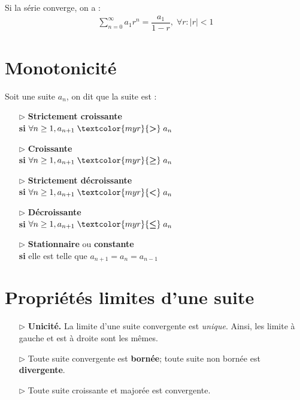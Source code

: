 \documentclass{report}
\begin{document}
\begin{multicols*}{3}
        Si la série converge, on a :
        \begin{align*}
            \boxed{
            \sum_{n=0}^{\infty }a_1r^{n} = 
            \dfrac{a_1}{1 - r}, \; \forall r \colon |r| < 1 
        }
        \end{align*}

    \section{Monotonicité} 
    Soit une suite $a_n$, on dit que la suite est : 
    \begin{itemize} 
        \item[$\rhd$ ] \textbf{Strictement croissante} 
            \\ \textbf{si} $\forall n \geq 1, a_{n+1} \; \textcolor{myr}{\boldsymbol{>}} \; a_n$         
        \item[$\rhd$ ] \textbf{Croissante} \\ 
            \textbf{si} $\forall n \geq 1, a_{n+1}\;  \textcolor{myr}{\boldsymbol{\geq}} \; a_n$         
        \item[$\rhd$ ] \textbf{Strictement décroissante} \\ 
            \textbf{si} $\forall n \geq 1, a_{n+1} \; \textcolor{myr}{\boldsymbol{<}}  \;a_n$ 
        \item[$\rhd$ ] \textbf{Décroissante} \\ 
            \textbf{si} $\forall n \geq 1, a_{n+1} \;  \textcolor{myr}{\boldsymbol{\leq}}  \; a_n$ 
        \item[$\rhd$ ] \textbf{Stationnaire} ou \textbf{constante} \\ 
            \textbf{si} elle est telle que $a_{n+1} = a_n = a_{n-1}$
    \end{itemize}

    \section{Propriétés limites d'une suite}
    \begin{itemize}
        \item[$\rhd$] \textbf{Unicité.} La limite d'une suite convergente est \textit{unique}. Ainsi, les limite à gauche 
            et est à droite sont les mêmes. 
        
        \item[$\rhd$] Toute suite convergente est \textbf{bornée};  
            toute suite non bornée est \textbf{divergente}.        
        \item[$\rhd$] Toute suite croissante et majorée est convergente. 


\end{itemize}
\end{multicols*}
\end{document}

